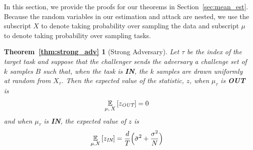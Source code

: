 In this section, we provide the proofs for our theorems in Section~\ref{sec:mean_est}. Because the random variables in our estimation and attack are nested, we use the subscript $X$ to denote taking probability over sampling the data and subscript $\mu$ to denote taking probability over sampling tasks.
\newcommand{\mubar}[0]{\bar{\mu}}
\newcommand{\muhat}[0]{\hat{\mu}}
\newcommand{\muB}[0]{\mu_B}

\newtheorem*{strongadv}{Theorem~\ref{thm:strong_adv}}
\begin{strongadv}[Strong Adversary]  

Let $\tau$ be the index of the target task and suppose that the challenger sends the adversary a challenge set of $k$ samples $B$ such that, when the task is \textbf{IN}, the $k$ samples are drawn uniformly at random from $X_\tau$. Then the expected value of the statistic, $z$, when $\mu_\tau$ is \textbf{OUT} is 
    \[
        \ex{\mu, \: X}{z_{\textit{OUT}}} = 0
    \]
    and when  $\mu_\tau$ is \textbf{IN}, the expected value of $z$ is
    \[
        \ex{\mu, X}{z_{\textit{IN}}} = \frac{d}{T} \Big( \bar{\sigma}^2 + \frac{\sigma^2}{N} \Big)
    \]
\end{strongadv} 

